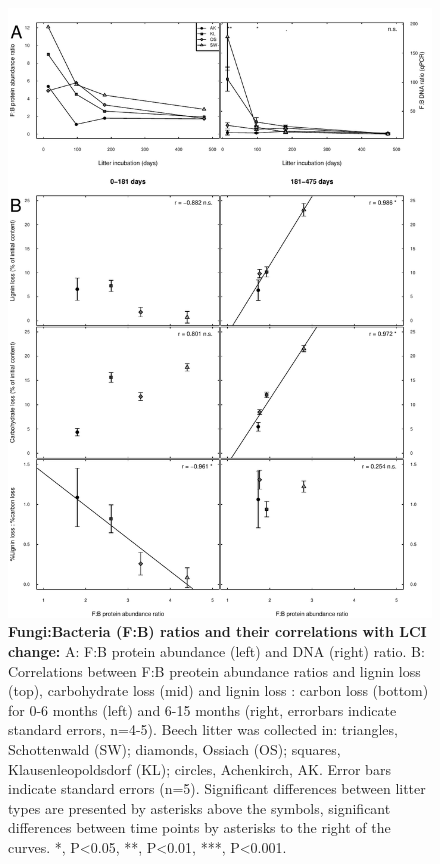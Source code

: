 \documentclass[10pt]{article}
\begin{document}
\begin{flushleft}
\begin{figure}[!ht]
\begin{center}
\includegraphics{ligpaper-f2bnew}
\end{center}
\caption{
{\bf Fungi:Bacteria (F:B) ratios and their correlations with LCI change:} A: F:B protein abundance (left) and DNA (right) ratio. B: Correlations between F:B preotein abundance ratios and lignin loss (top), carbohydrate loss (mid) and lignin loss : carbon loss (bottom) for 0-6 months (left) and 6-15 months (right, errorbars indicate standard errors, n=4-5).  Beech litter was collected in: triangles, Schottenwald (SW); diamonds, Ossiach (OS); squares, Klausenleopoldsdorf (KL); circles, Achenkirch, AK. Error bars indicate standard errors (n=5). Significant differences between litter types are presented by asterisks above the symbols, significant differences between time points by asterisks to the right of the curves. *, P\textless 0.05, **, P\textless 0.01, ***, P\textless 0.001.}
\end{figure}


\end{flushleft}
\end{document}
